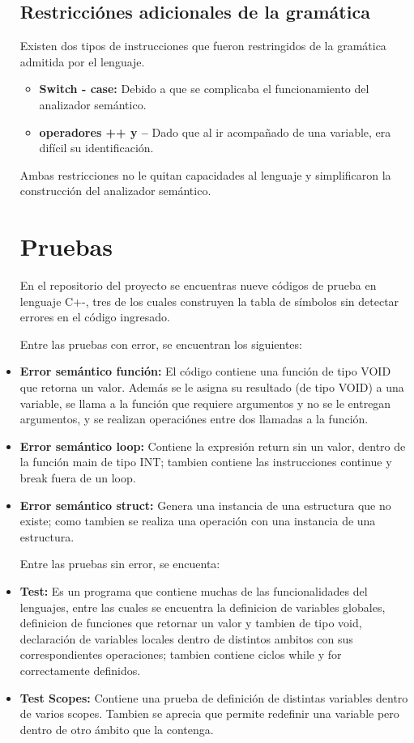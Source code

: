 \documentclass[12pt]{article}
\begin{document}
\begin{itemize}
\subsection*{Restricciónes adicionales de la gramática}

Existen dos tipos de instrucciones que fueron restringidos de la gramática admitida por el lenguaje.

\begin{itemize}
    \item \textbf{Switch - case: } Debido a que se complicaba el funcionamiento del analizador semántico.
    \item \textbf{operadores ++ y --} Dado que al ir acompañado de una variable, era dif\'icil su identificación.
\end{itemize}
Ambas restricciones no le quitan capacidades al lenguaje y simplificaron la construcción del analizador semántico.

\clearpage
\section*{Pruebas}
En el repositorio del proyecto se encuentras nueve c\'odigos de prueba en lenguaje C+-, tres de los cuales construyen la tabla de s\'imbolos sin detectar errores en el código ingresado.

Entre las pruebas con error, se encuentran los siguientes:
\item \textbf{Error semántico función: } El código contiene una función de tipo VOID que retorna un valor. Además se le asigna su resultado (de tipo VOID) a una variable, se llama a la función que requiere argumentos y no se le entregan argumentos, y se realizan operaciónes entre dos llamadas a la función.

\item \textbf{Error semántico loop: } Contiene la expresión return sin un valor, dentro de la función main de tipo INT; tambien contiene las instrucciones continue y break fuera de un loop.  

\item \textbf{Error semántico struct: } Genera una instancia de una estructura que no existe; como tambien se realiza una operación con una instancia de una estructura.


Entre las pruebas sin error, se encuenta:
\item \textbf{Test: } Es un programa que contiene muchas de las funcionalidades del lenguajes, entre las cuales se encuentra la definicion de variables globales, definicion de funciones que retornar un valor y tambien de tipo void, declaración de variables locales dentro de distintos ambitos con sus correspondientes operaciones; tambien contiene ciclos while y for correctamente definidos.

\item \textbf{Test Scopes: } Contiene una prueba de definición de distintas variables dentro de varios scopes. Tambien se aprecia que permite redefinir una variable pero dentro de otro ámbito que la contenga. 
\end{itemize}
\end{document}
